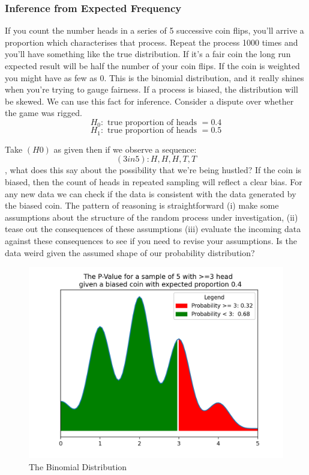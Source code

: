 \documentclass[10pt,a4paper,notitlepage, twocolumn]{article}
\begin{document}
\subsubsection*{Inference from Expected Frequency}
If you count the number heads in a series of 5 successive coin flips, you'll arrive a proportion which characterises that process. Repeat the process 1000 times and you'll have something like the true distribution. If it's a fair coin the long run expected result will be half the number of your coin flips. If the coin is weighted you might have as few as 0. This is the binomial distribution, and it really shines when you're trying to gauge fairness. If a process is biased, the distribution will be skewed. We can use this fact for inference. Consider a dispute over whether the game was rigged. 
$$ H_0 : \text{ true proportion of heads } = 0.4  $$
$$ H_1 : \text{ true proportion of heads } =  0.5 $$

\noindent Take $(H0)$ as given then if we observe a sequence: $$ (3in5): H, H, H, T, T$$, what does this say about the possibility that we're being hustled? If the coin is biased, then the count of heads in repeated sampling will reflect a clear bias. For any new data we can check if the data is consistent with the data generated by the biased coin. The pattern of reasoning is straightforward (i) make some assumptions about the structure of the random process under investigation, (ii) tease out the consequences of these assumptions (iii) evaluate the incoming data against these consequences to see if you need to revise your assumptions. Is the data weird given the assumed shape of our probability distribution?

\begin{figure}[H]
  \includegraphics[width=\linewidth]{./Plots/binomial_test.png}
  \caption{The Binomial Distribution}
\end{figure}
\end{document}
